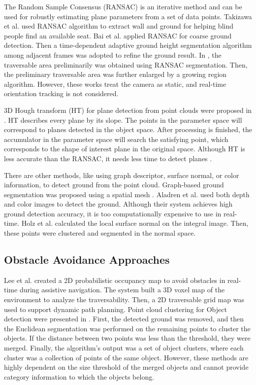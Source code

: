 \documentclass{ieeeaccess}
\begin{document}
The Random Sample Consensus (RANSAC) is an iterative method and can be used for robustly estimating plane parameters from a set of data points. Takizawa et al. \cite{takizawa2019kinect} used RANSAC algorithm to extract wall and ground for helping blind people find an available seat. Bai et al. \cite{bai2019wearable} applied RANSAC for coarse ground detection. Then a time-dependent adaptive ground height segmentation algorithm among adjacent frames was adopted to refine the ground result. In \cite{yang2016expanding}, the traversable area preliminarily was obtained using RANSAC segmentation. Then, the preliminary traversable area was further enlarged by a growing region algorithm. However, these works treat the camera as static, and real-time orientation tracking is not considered. 

3D Hough transform (HT) for plane detection from point clouds were proposed in \cite{hulik2014continuous}. HT describes every plane by its slope. The points in the parameter space will correspond to planes detected in the object space. After processing is finished, the accumulator in the parameter space will search the satisfying point, which corresponds to the shape of interest plane in the original space. Although HT is less accurate than the RANSAC, it needs less time to detect planes \cite{zeineldin2016fast}.
 
 
There are other methods, like using graph descriptor, surface normal, or color information, to detect ground from the point cloud. Graph-based ground segmentation was proposed using a spatial mesh \cite{strom2010graph}. Aladren et al. \cite{aladren2014navigation} used both depth and color images to detect the ground. Although their system achieves high ground detection accuracy, it is too computationally expensive to use in real-time.  Holz et al. \cite{holz2011real} calculated the local surface normal on the integral image. Then, these points were clustered and segmented in the normal space.




\subsection{Obstacle Avoidance Approaches}
Lee et al. \cite{lee2014wearable} created a 2D probabilistic occupancy map to avoid obstacles in real-time during assistive navigation. The system built a 3D voxel map of the environment to analyze the traversability. Then, a 2D traversable grid map was used to support dynamic path planning. Point cloud clustering for Object detection were presented in \cite{wang2017enabling} \cite{vision_based_mobile_indoor_nav_BingLi_2019}. First, the detected ground was removed, and then the Euclidean segmentation was performed on the remaining points to cluster the objects. If the distance between two points was less than the threshold, they were merged. Finally, the algorithm's output was a set of object clusters, where each cluster was a collection of points of the same object. However, these methods are highly dependent on the size threshold of the merged objects and cannot provide category information to which the objects belong.
\end{document}
